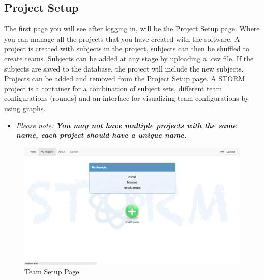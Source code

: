 \subsection{Project Setup}\par
The first page you will see after logging in, will be the Project Setup page.  Where you can manage all the projects that you have created with the software. A project is created with subjects in the project, subjects can then be shuffled to create teams. Subjects can be added at any stage by uploading a .csv file. If the subjects are saved to the database, the project will include the new subjects. Projects can be added and removed from the Project Setup page. A STORM project is a container for a combination of subject sets, different team configurations (rounds) and an interface for visualizing team configurations by using graphs.\par
\begin{itemize}
	\item[] \textit{Please note: \textbf{You may not have multiple projects with the same name, each project should have a unique name.}}
\end{itemize}
 \begin{figure}[H] 
	\centering
	\includegraphics[width=13cm]{./graphics/TeamSetup.jpg}\par
	\caption{Team Setup Page}
\end{figure}

